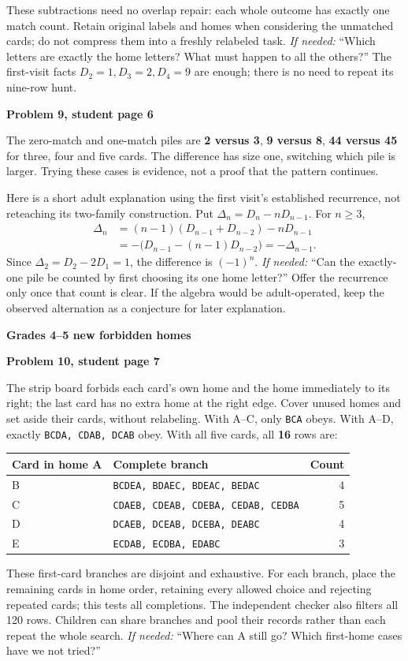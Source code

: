 \documentclass[11pt]{article}
\newcommand{\head}[1]{\par\textbf{\large #1}\par}
\newcommand{\sub}[1]{\par\textbf{#1}\par}
\newcommand{\row}[1]{\texttt{#1}}
\newcommand{\hint}[1]{\emph{If needed:} #1}
\begin{document}
These subtractions need no overlap repair: each whole outcome has exactly one match count. Retain original labels and homes when considering the unmatched cards; do not compress them into a freshly relabeled task. \hint{``Which letters are exactly the home letters? What must happen to all the others?''} The first-visit facts $D_2=1,D_3=2,D_4=9$ are enough; there is no need to repeat its nine-row hunt.

\sub{Problem 9, student page 6}
The zero-match and one-match piles are \textbf{2 versus 3}, \textbf{9 versus 8}, \textbf{44 versus 45} for three, four and five cards. The difference has size one, switching which pile is larger. Trying these cases is evidence, not a proof that the pattern continues.

Here is a short adult explanation using the first visit's established recurrence, not reteaching its two-family construction. Put $\Delta_n=D_n-nD_{n-1}$. For $n\ge3$,
\[
\begin{aligned}
\Delta_n
&=(n-1)(D_{n-1}+D_{n-2})-nD_{n-1}\\
&=-\bigl(D_{n-1}-(n-1)D_{n-2}\bigr)=-\Delta_{n-1}.
\end{aligned}
\]
Since $\Delta_2=D_2-2D_1=1$, the difference is $(-1)^n$. \hint{``Can the exactly-one pile be counted by first choosing its one home letter?''} Offer the recurrence only once that count is clear. If the algebra would be adult-operated, keep the observed alternation as a conjecture for later explanation.
\newpage
\head{Grades 4--5 new forbidden homes}
\sub{Problem 10, student page 7}
The strip board forbids each card's own home and the home immediately to its right; the last card has no extra home at the right edge. Cover unused homes and set aside their cards, without relabeling. With A--C, only \row{BCA} obeys. With A--D, exactly \row{BCDA, CDAB, DCAB} obey. With all five cards, all \textbf{16} rows are:
\begin{center}\small
\begin{tabular}{llr}
Card in home A & Complete branch & Count\\\midrule
B & \row{BCDEA, BDAEC, BDEAC, BEDAC} & 4\\
C & \row{CDAEB, CDEAB, CDEBA, CEDAB, CEDBA} & 5\\
D & \row{DCAEB, DCEAB, DCEBA, DEABC} & 4\\
E & \row{ECDAB, ECDBA, EDABC} & 3
\end{tabular}
\end{center}
These first-card branches are disjoint and exhaustive. For each branch, place the remaining cards in home order, retaining every allowed choice and rejecting repeated cards; this tests all completions. The independent checker also filters all 120 rows. Children can share branches and pool their records rather than each repeat the whole search. \hint{``Where can A still go? Which first-home cases have we not tried?''}
\end{document}

